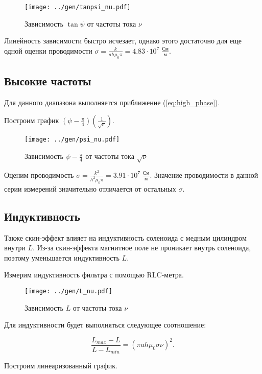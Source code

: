 \begin{figure}[H]
	\centering
	\texttt{[image: ../gen/tanpsi\_nu.pdf]}
	\caption{Зависимость $\tan \psi$ от частоты тока $\nu$}
	\label{fig:tanpsi_nu}
\end{figure}

Линейность зависимости быстро исчезает, однако этого достаточно для еще одной оценки проводимости $\sigma = \frac{k}{a h \mu_0 \pi} = 4.83 \cdot 10^7 \; \frac{\text{См}}{\text{м}}$.

\subsection*{Высокие частоты}

Для данного диапазона выполняется приближение (\ref{eq:high_phase}).

Построим график $(\psi - \frac{\pi}{4}) (\frac{1}{\sqrt{\nu}})$.

\begin{figure}[H]
	\centering
	\texttt{[image: ../gen/psi\_nu.pdf]}
	\caption{Зависимость $\psi - \frac{\pi}{4}$ от частоты тока $\sqrt{\nu}$}
	\label{fig:psi_nu}
\end{figure}

Оценим проводимость $\sigma = \frac{k^2}{h^2 \mu_0 \pi}= 3.91 \cdot 10^7 \; \frac{\text{См}}{\text{м}}$.
Значение проводимости в данной серии измерений значительно отличается от остальных $\sigma$.

\subsection*{Индуктивность}

Также скин-эффект влияет на индуктивность соленоида с медным цилиндром внутри $L$. Из-за скин-эффекта магнитное поле не проникает внутрь соленоида, поэтому уменьшается индуктивность $L$.

Измерим индуктивность фильтра с помощью RLC-метра. 

\begin{figure}[H]
	\centering
	\texttt{[image: ../gen/L\_nu.pdf]}
	\caption{Зависимость $L$ от частоты тока $\nu$}
	\label{fig:L_nu}
\end{figure}

Для индуктивности будет выполняться следующее соотношение:

$$\frac{L_{max} - L}{L - L_{min}} = (\pi a h \mu_0 \sigma \nu)^2.$$

Построим линеаризованный график.

